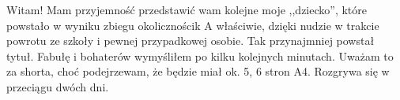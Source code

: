 \documentclass[../MAIN.tex]{subfiles}
\begin{document}
Witam! Mam przyjemność przedstawić wam kolejne moje
,,dziecko'', które powstało w wyniku zbiegu okoliczności\3k A
właściwie, dzięki nudzie w trakcie powrotu ze szkoły i pewnej
przypadkowej osobie. Tak przynajmniej powstał tytuł. Fabułę i
bohaterów wymyśliłem po kilku kolejnych minutach.
Uważam to za shorta, choć podejrzewam, że będzie miał ok. 5, 6
stron A4. Rozgrywa się w przeciągu dwóch
dni.
\end{document}
